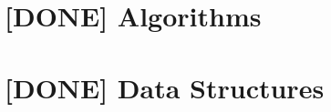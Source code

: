 \clearemptydoublepage
\part{[DONE] Algorithms}



\clearemptydoublepage
\part{[DONE] Data Structures}


